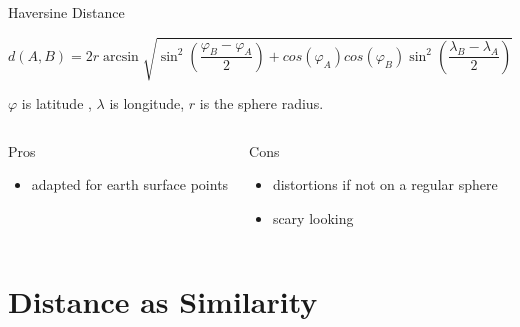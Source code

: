 \documentclass{beamer}
\begin{document}
\begin{frame}{Haversine Distance}


\begin{scriptsize}
$$d(A,B)=2r \arcsin  \sqrt{\sin ^{2} \left( {\frac{\varphi_{B}-\varphi_{A}}{2}}  \right) + cos(\varphi_A)cos(\varphi_B)\sin ^{2} \left( {\frac{\lambda_{B}-\lambda_{A}}{2}}  \right) }$$

$\varphi$ is latitude , $\lambda$ is longitude, $r$ is the sphere radius.


\begin{columns}[T,onlytextwidth]
\begin{block}{Pros}
\begin{itemize}
  \item adapted for earth surface points
\end{itemize}
\end{block}
\begin{block}{Cons}
\begin{spacing}{0.9}
\begin{itemize}
  \item distortions if not on a regular sphere
  \item scary looking 
\end{itemize}
\end{spacing}
\end{block}
\end{columns}
\end{scriptsize}




\end{frame}



\section{Distance as Similarity}
\end{document}
